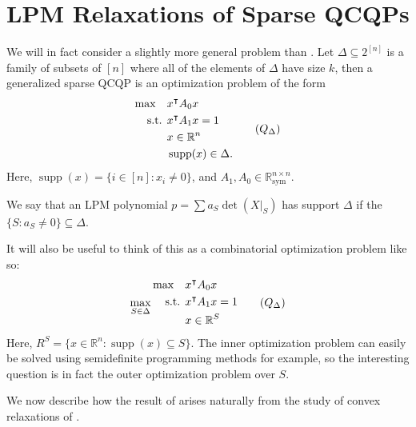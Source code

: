 \documentclass{amsart}
\theoremstyle{definition}
\newcommand{\R}{\mathbb{R}}
\DeclareMathOperator*{\supp}{supp}
\newcommand{\st}{{\text{ s.t. }}}
\newcommand*{\Sym}{\R^{n \times n}_{\mathrm{sym}}}
\begin{document}
\section{LPM Relaxations of Sparse QCQPs}
 \label{sec:lpm_relaxation}

We will in fact consider a slightly more general problem than . Let $\Delta \subseteq 2^{[n]}$ is a family of subsets of $[n]$ where all of the elements of $\Delta$ have size $k$, then a generalized sparse QCQP is an optimization problem of the form
\begin{equation}\label{eq:sparse_qcqp}
    \begin{aligned}
        \max\quad & x^{\intercal}A_0x\\
        \st & x^{\intercal}A_1x = 1\\
            & x \in \R^n\\
            &\supp(x) \in \Delta.
    \end{aligned}
    \tag{$Q_{\Delta}$}
\end{equation}
Here, $\supp(x) = \{i \in [n] : x_i \neq 0\}$, and $A_1, A_0 \in \Sym$.

We say that an LPM polynomial $p = \sum a_S \det(X|_S)$ has support $\Delta$ if the $\{S : a_S \neq 0\} \subseteq \Delta$.

It will also be useful to think of this as a combinatorial optimization problem like so:
\begin{equation}\label{eq:sparse_qcqp_2}
    \max_{S \in \Delta}
    \begin{aligned}
        \max\quad & x^{\intercal}A_0x\\
        \st & x^{\intercal}A_1x = 1\\
            & x \in \R^S\\
    \end{aligned}
    \tag{$Q_{\Delta}$}
\end{equation}
Here, $R^S = \{x \in \R^n : \supp(x) \subseteq S\}$. The inner optimization problem can easily be solved using semidefinite programming methods for example, so the interesting question is in fact the outer optimization problem over $S$.

We now describe how the result of  arises naturally from the study of convex relaxations of .
\end{document}

